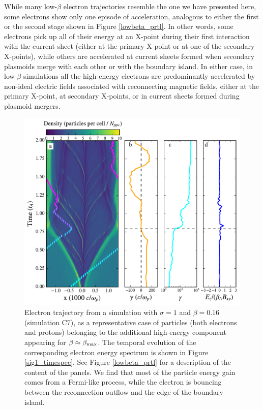 While many low-$\beta$ electron trajectories resemble the one we have presented here, some electrons show only one episode of acceleration, analogous to either the first or the second stage shown in Figure \ref{lowbeta_prtl}. In other words, 
some electrons pick up all of their energy at an X-point during their first interaction with the current sheet (either at the primary X-point or at one of the secondary X-points), while others are accelerated at current sheets formed when secondary plasmoids merge with each other or with the boundary island.  In either case, in low-$\beta$ simulations all the high-energy electrons are predominantly accelerated by non-ideal electric fields associated with reconnecting magnetic fields, either at the primary X-point, at secondary X-points, or in current sheets formed during plasmoid mergers.


\begin{figure}[!t]
\centering
\includegraphics[width =\textwidth]{highbeta_lec.pdf}
\caption{Electron trajectory from a simulation with $\sigma=1$ and $\beta=0.16$ (simulation C7), as a representative case of particles (both electrons and protons) belonging to the additional high-energy component appearing for $\beta\approx \beta_{\rm max}$. The temporal evolution of the corresponding electron energy spectrum is shown in Figure \ref{sig1_timespec}. See Figure \ref{lowbeta_prtl} for a description of the content of the panels.  We find that most of the particle energy gain comes from a Fermi-like process, while the electron is bouncing between the reconnection outflow and the edge of the boundary island.}
\label{highbeta_prtl}
\end{figure}


